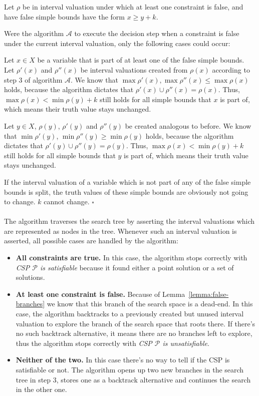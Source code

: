 Let $\rho$ be in interval valuation under which at least one constraint is false, and have false simple bounds have the form $x \geq y + k$.

Were the algorithm $\mathcal{A}$ to execute the decision step when a constraint is false under the current interval valuation, only the following cases could occur:

Let $x \in X$ be a variable that is part of at least one of the false simple bounds.
Let $\rho'(x)$ and $\rho''(x)$ be interval valuations created from $\rho(x)$ according to step 3 of algorithm $\mathcal{A}$.
We know that $\max \rho'(x), \max \rho''(x) \leq \max \rho(x)$ holds, because the algorithm dictates that $\rho'(x) \cup \rho''(x) = \rho(x)$.
Thus, $\max \rho(x) < \min \rho(y) + k$ still holds for all simple bounds that $x$ is part of, which means their truth value stays unchanged.

Let $y \in X$, $\rho(y)$, $\rho'(y)$ and $\rho''(y)$ be created analogous to before.
We know that $\min \rho'(y)$, $\min \rho''(y) \geq \min \rho(y)$ holds, because the algorithm dictates that $\rho'(y) \cup \rho''(y) = \rho(y)$.
Thus, $\max \rho(x) < \min \rho(y) + k$ still holds for all simple bounds that $y$ is part of, which means their truth value stays unchanged.

If the interval valuation of a variable which is not part of any of the false simple bounds is split, the truth values of these simple bounds are obviously not going to change. $k$ cannot change. $\square$


\paragraph{}
The algorithm traverses the search tree by asserting the interval valuations which are represented as nodes in the tree.
Whenever such an interval valuation is asserted, all possible cases are handled by the algorithm:

\begin{itemize}
    \item
        \textbf{All constraints are true.}
        In this case, the algorithm stops correctly with \emph{CSP $\mathcal{P}$ is satisfiable} because it found either a point solution or a set of solutions.
    
    \item
        \textbf{At least one constraint is false.}
        Because of Lemma~\ref{lemma:false-branches} we know that this branch of the search space is a dead-end.
        In this case, the algorithm backtracks to a previously created but unused interval valuation to explore the branch of the search space that roots there.
        If there's no such backtrack alternative, it means there are no branches left to explore, thus the algorithm stops correctly with \emph{CSP $\mathcal{P}$ is unsatisfiable}.
    \item
        \textbf{Neither of the two.}
        In this case there's no way to tell if the CSP is satisfiable or not.
        The algorithm opens up two new branches in the search tree in step 3, stores one as a backtrack alternative and continues the search in the other one.
\end{itemize}

